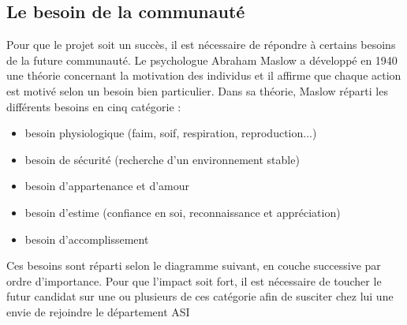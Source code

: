 \subsection{Le besoin de la communauté}

Pour que le projet soit un succès, il est nécessaire de répondre à certains besoins de la future communauté. Le psychologue Abraham Maslow a développé en 1940 une théorie concernant la motivation des individus et il affirme que chaque action est motivé selon un besoin bien particulier.
Dans sa théorie, Maslow réparti les différents besoins en cinq catégorie :
\begin{itemize}
	\item besoin physiologique (faim, soif, respiration, reproduction...)
	\item besoin de sécurité (recherche d'un environnement stable)
	\item besoin d'appartenance et d'amour
	\item besoin d'estime (confiance en soi, reconnaissance et appréciation)
	\item besoin d'accomplissement
\end{itemize}

Ces besoins sont réparti selon le diagramme suivant, en couche successive par ordre d'importance. Pour que l'impact soit fort, il est nécessaire de toucher le futur candidat sur une ou plusieurs de ces catégorie afin de susciter chez lui une envie de rejoindre le département ASI

